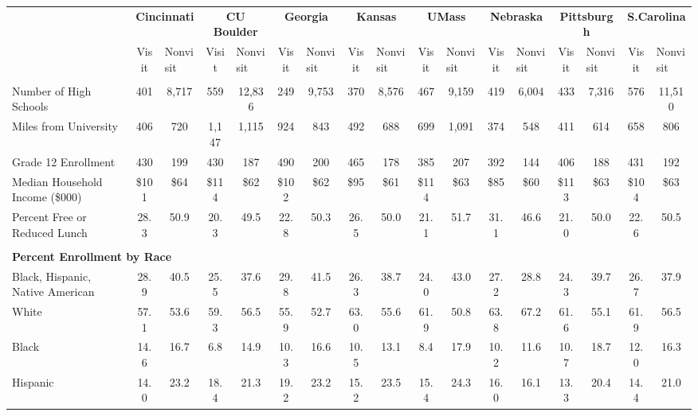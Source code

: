 \begin{tabular*}{\linewidth}{@{\extracolsep{\fill} } lcccccccccccccccc}%
&\multicolumn{2}{c}{\bfseries Cincinnati}&\multicolumn{2}{c}{\bfseries CU Boulder}&\multicolumn{2}{c}{\bfseries Georgia}&\multicolumn{2}{c}{\bfseries Kansas}&\multicolumn{2}{c}{\bfseries UMass}&\multicolumn{2}{c}{\bfseries Nebraska}&\multicolumn{2}{c}{\bfseries Pittsburgh}&\multicolumn{2}{c}{\bfseries S.Carolina}\\%
&Visit&\multicolumn{1}{l}{Nonvisit}&Visit&\multicolumn{1}{l}{Nonvisit}&Visit&\multicolumn{1}{l}{Nonvisit}&Visit&\multicolumn{1}{l}{Nonvisit}&Visit&\multicolumn{1}{l}{Nonvisit}&Visit&\multicolumn{1}{l}{Nonvisit}&Visit&\multicolumn{1}{l}{Nonvisit}&Visit&\multicolumn{1}{l}{Nonvisit}\\%
\hline%
&&&&&&&&&&&&&&&&\\%
\hspace{0cm}Number of High Schools&401&8,717&559&12,836&249&9,753&370&8,576&467&9,159&419&6,004&433&7,316&576&11,510\\%
\hspace{0cm}Miles from University&406&720&1,147&1,115&924&843&492&688&699&1,091&374&548&411&614&658&806\\%
\hspace{0cm}Grade 12 Enrollment&430&199&430&187&490&200&465&178&385&207&392&144&406&188&431&192\\%
\hspace{0cm}Median Household Income (\$000)&\$101&\$64&\$114&\$62&\$102&\$62&\$95&\$61&\$114&\$63&\$85&\$60&\$113&\$63&\$104&\$63\\%
\hspace{0cm}Percent Free or Reduced Lunch&28.3&50.9&20.3&49.5&22.8&50.3&26.5&50.0&21.1&51.7&31.1&46.6&21.0&50.0&22.6&50.5\\%
&&&&&&&&&&&&&&&&\\%
\multicolumn{17}{l}{\bfseries Percent Enrollment by Race}\\%
\hspace{0.2cm}Black, Hispanic, Native American&28.9&40.5&25.5&37.6&29.8&41.5&26.3&38.7&24.0&43.0&27.2&28.8&24.3&39.7&26.7&37.9\\%
\hspace{0.2cm}White&57.1&53.6&59.3&56.5&55.9&52.7&63.0&55.6&61.9&50.8&63.8&67.2&61.6&55.1&61.9&56.5\\%
\hspace{0.2cm}Black&14.6&16.7&6.8&14.9&10.3&16.6&10.5&13.1&8.4&17.9&10.2&11.6&10.7&18.7&12.0&16.3\\%
\hspace{0.2cm}Hispanic&14.0&23.2&18.4&21.3&19.2&23.2&15.2&23.5&15.4&24.3&16.0&16.1&13.3&20.4&14.4&21.0\\%

\end{tabular*}
